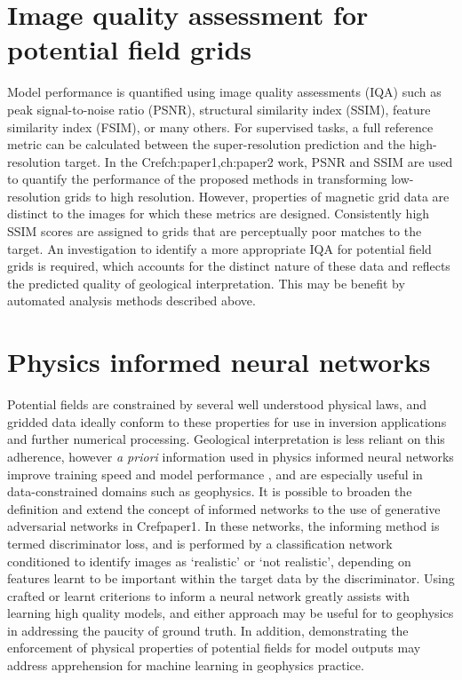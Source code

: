 \documentclass[manuscript.tex]{subfiles}
\begin{document}
\section{Image quality assessment for potential field grids}
Model performance is quantified using image quality assessments (IQA) such as peak signal-to-noise ratio (PSNR), structural similarity index (SSIM), feature similarity index (FSIM), or many others.
For supervised tasks, a full reference metric can be calculated between the super-resolution prediction and the high-resolution target.
In the Cref{ch:paper1,ch:paper2} work, PSNR and SSIM are used to quantify the performance of the proposed methods in transforming low-resolution grids to high resolution.
However, properties of magnetic grid data are distinct to the images for which these metrics are designed.
Consistently high SSIM scores are assigned to grids that are perceptually poor matches to the target.
An investigation to identify a more appropriate IQA for potential field grids is required, which accounts for the distinct nature of these data and reflects the predicted quality of geological interpretation.
This may be benefit by automated analysis methods described above.

\section{Physics informed neural networks}
Potential fields are constrained by several well understood physical laws, and gridded data ideally conform to these properties for use in inversion applications and further numerical processing.
Geological interpretation is less reliant on this adherence, however \emph{a priori} information used in physics informed neural networks improve training speed and model performance \parencite{raissiPhysicsinformedNeuralNetworks2019}, and are especially useful in data-constrained domains such as geophysics.
It is possible to broaden the definition and extend the concept of informed networks to the use of generative adversarial networks in Cref{paper1}.
In these networks, the informing method is termed discriminator loss, and is performed by a classification network conditioned to identify images as `realistic' or `not realistic', depending on features learnt to be important within the target data by the discriminator.
Using crafted or learnt criterions to inform a neural network greatly assists with learning high quality models, and either approach may be useful for to geophysics in addressing the paucity of ground truth.
In addition, demonstrating the enforcement of physical properties of potential fields for model outputs may address apprehension for machine learning in geophysics practice.
\end{document}
